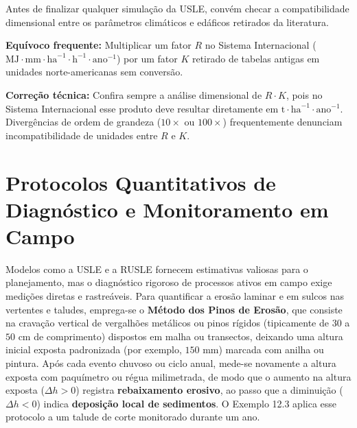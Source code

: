 Antes de finalizar qualquer simulação da USLE, convém checar a compatibilidade dimensional entre os parâmetros climáticos e edáficos retirados da literatura.

\begin{boxErro}
\textbf{Equívoco frequente:} Multiplicar um fator $R$ no Sistema Internacional ($\text{MJ}\cdot\text{mm}\cdot\text{ha}^{-1}\cdot\text{h}^{-1}\cdot\text{ano}^{-1}$) por um fator $K$ retirado de tabelas antigas em unidades norte-americanas sem conversão.\par
\textbf{Correção técnica:} Confira sempre a análise dimensional de $R \cdot K$, pois no Sistema Internacional esse produto deve resultar diretamente em $\text{t}\cdot\text{ha}^{-1}\cdot\text{ano}^{-1}$. Divergências de ordem de grandeza ($10\times$ ou $100\times$) frequentemente denunciam incompatibilidade de unidades entre $R$ e $K$.
\end{boxErro}

\section{Protocolos Quantitativos de Diagnóstico e Monitoramento em Campo}

Modelos como a USLE e a RUSLE fornecem estimativas valiosas para o planejamento, mas o diagnóstico rigoroso de processos ativos em campo exige medições diretas e rastreáveis. Para quantificar a erosão laminar e em sulcos nas vertentes e taludes, emprega-se o \textbf{Método dos Pinos de Erosão}, que consiste na cravação vertical de vergalhões metálicos ou pinos rígidos (tipicamente de $30$ a $50\text{ cm}$ de comprimento) dispostos em malha ou transectos, deixando uma altura inicial exposta padronizada (por exemplo, $150\text{ mm}$) marcada com anilha ou pintura. Após cada evento chuvoso ou ciclo anual, mede-se novamente a altura exposta com paquímetro ou régua milimetrada, de modo que o aumento na altura exposta ($\Delta h > 0$) registra \textbf{rebaixamento erosivo}, ao passo que a diminuição ($\Delta h < 0$) indica \textbf{deposição local de sedimentos}. O Exemplo 12.3 aplica esse protocolo a um talude de corte monitorado durante um ano.

